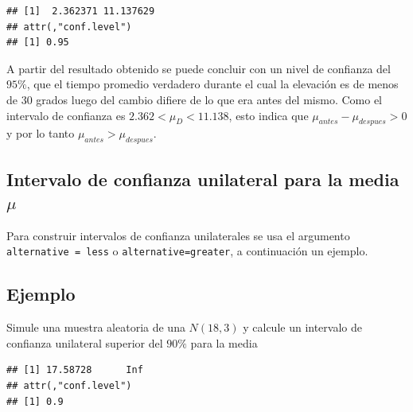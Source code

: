 \documentclass[
]{book}
\makeatletter
\newenvironment{Shaded}{\begin{snugshade}}{\end{snugshade}}
\newcommand{\AttributeTok}[1]{\textcolor[rgb]{0.77,0.63,0.00}{#1}}
\newcommand{\DecValTok}[1]{\textcolor[rgb]{0.00,0.00,0.81}{#1}}
\newcommand{\FloatTok}[1]{\textcolor[rgb]{0.00,0.00,0.81}{#1}}
\newcommand{\FunctionTok}[1]{\textcolor[rgb]{0.00,0.00,0.00}{#1}}
\newcommand{\NormalTok}[1]{#1}
\newcommand{\OtherTok}[1]{\textcolor[rgb]{0.56,0.35,0.01}{#1}}
\newcommand{\SpecialCharTok}[1]{\textcolor[rgb]{0.00,0.00,0.00}{#1}}
\newcommand{\StringTok}[1]{\textcolor[rgb]{0.31,0.60,0.02}{#1}}
\newenvironment{kframe}{%
\medskip{}
\setlength{\fboxsep}{.8em}
 \def\at@end@of@kframe{}%
 \ifinner\ifhmode%
  \def\at@end@of@kframe{\end{minipage}}%
  \begin{minipage}{\columnwidth}%
 \fi\fi%
 \def\FrameCommand##1{\hskip\@totalleftmargin \hskip-\fboxsep
 \colorbox{shadecolor}{##1}\hskip-\fboxsep
     \hskip-\linewidth \hskip-\@totalleftmargin \hskip\columnwidth}%
 \MakeFramed {\advance\hsize-\width
   \@totalleftmargin\z@ \linewidth\hsize
   \@setminipage}}%
 {\par\unskip\endMakeFramed%
 \at@end@of@kframe}
\renewenvironment{Shaded}{\begin{kframe}}{\end{kframe}}
\makeatother
\begin{document}
\begin{verbatim}
## [1]  2.362371 11.137629
## attr(,"conf.level")
## [1] 0.95
\end{verbatim}

A partir del resultado obtenido se puede concluir con un nivel de confianza del \(95\%\), que el tiempo promedio verdadero durante el cual la elevación es de menos de 30 grados luego del cambio difiere de lo que era antes del mismo. Como el intervalo de confianza es \(2.362< \mu_D < 11.138\), esto indica que \(\mu_{antes} - \mu_{despues}>0\) y por lo tanto \(\mu_{antes} > \mu_{despues}\).

\hypertarget{intervalo-de-confianza-unilateral-para-la-media-mu}{%
\subsection{\texorpdfstring{Intervalo de confianza unilateral para la media \(\mu\)}{Intervalo de confianza unilateral para la media \textbackslash mu}}\label{intervalo-de-confianza-unilateral-para-la-media-mu}}

Para construir intervalos de confianza unilaterales se usa el argumento \texttt{alternative\ =\ \textquotesingle{}less\textquotesingle{}} o \texttt{alternative=\textquotesingle{}greater\textquotesingle{}}, a continuación un ejemplo.

\hypertarget{ejemplo-58}{%
\subsection*{Ejemplo}\label{ejemplo-58}}

Simule una muestra aleatoria de una \(N(18, 3)\) y calcule un intervalo de confianza unilateral superior del \(90\%\) para la media

\begin{Shaded}
\end{Shaded}

\begin{verbatim}
## [1] 17.58728      Inf
## attr(,"conf.level")
## [1] 0.9
\end{verbatim}
\end{document}
